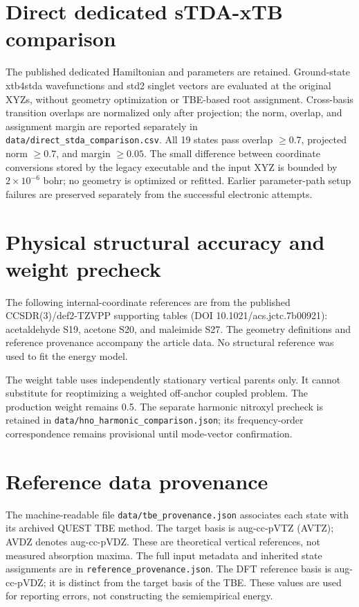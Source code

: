 \documentclass[11pt,a4paper]{article}
\begin{document}
\section{Direct dedicated sTDA-xTB comparison}
The published dedicated Hamiltonian and parameters are retained. Ground-state xtb4stda wavefunctions and std2 singlet vectors are evaluated at the original XYZs, without geometry optimization or TBE-based root assignment. Cross-basis transition overlaps are normalized only after projection; the norm, overlap, and assignment margin are reported separately in \texttt{data/direct\_stda\_comparison.csv}. All 19 states pass overlap $\geq0.7$, projected norm $\geq0.7$, and margin $\geq0.05$. The small difference between coordinate conversions stored by the legacy executable and the input XYZ is bounded by $2\times10^{-6}$ bohr; no geometry is optimized or refitted. Earlier parameter-path setup failures are preserved separately from the successful electronic attempts.

\section{Physical structural accuracy and weight precheck}
The following internal-coordinate references are from the published CCSDR(3)/def2-TZVPP supporting tables (DOI 10.1021/acs.jctc.7b00921): acetaldehyde S19, acetone S20, and maleimide S27. The geometry definitions and reference provenance accompany the article data. No structural reference was used to fit the energy model.


The weight table uses independently stationary vertical parents only. It cannot substitute for reoptimizing a weighted off-anchor coupled problem. The production weight remains 0.5. The separate harmonic nitroxyl precheck is retained in \texttt{data/hno\_harmonic\_comparison.json}; its frequency-order correspondence remains provisional until mode-vector confirmation.

\section{Reference data provenance}
The machine-readable file \texttt{data/tbe\_provenance.json} associates each state with its archived QUEST TBE method. The target basis is aug-cc-pVTZ (AVTZ); AVDZ denotes aug-cc-pVDZ. These are theoretical vertical references, not measured absorption maxima. The full input metadata and inherited state assignments are in \texttt{reference\_provenance.json}. The DFT reference basis is aug-cc-pVDZ; it is distinct from the target basis of the TBE. These values are used for reporting errors, not constructing the semiempirical energy.
\end{document}
